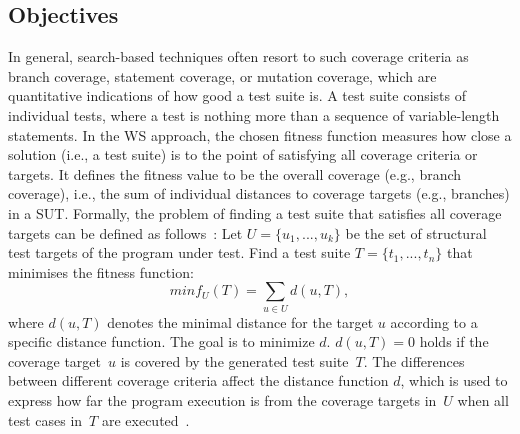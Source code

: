 \documentclass[paper=a4,%
  twoside,%
  BCOR4mm,%
  abstract=true,%
  toc=bibliography,%
  chapterprefix=true,%
  toc=bibliographynumbered,%
  open=right,%
  english,%
  pagesize=pdftex]{scrreprt}
\begin{document}
\subsection{Objectives}
In general, search-based techniques often resort to such coverage criteria as branch coverage, statement coverage, or mutation coverage, which are quantitative indications of how good a test suite is. A test suite consists of individual tests, where a test is nothing more than a sequence of variable-length statements. In the \ac{WS} approach, the chosen fitness function measures how close a solution (i.e., a test suite) is to the point of satisfying all coverage criteria or targets. It defines the fitness value to be the overall coverage (e.g., branch coverage), i.e., the sum of individual distances to coverage targets (e.g., branches) in a \ac{SUT}. Formally, the problem of finding a test suite that satisfies all coverage targets can be defined as follows~\cite{Panichella2018}: Let $U = \{u_1, ..., u_k\}$ be the set of structural test targets of the program under test. Find a test suite $T = \{t_1, ..., t_n\}$ that minimises the fitness function:
\begin{equation}
minf_U(T) = \sum_{u \in U}{d(u, T)},
\end{equation}
where $d(u, T)$ denotes the minimal distance for the target $u$ according to a specific distance function. The goal is to minimize $d$. $d(u, T) = 0$ holds if the coverage target~$u$ is covered by the generated test suite~$T$. The differences between different coverage criteria affect the distance function $d$, which is used to express how far the program execution is from the coverage targets in~$U$ when all test cases in~$T$ are executed~\cite{Panichella2018}.
\end{document}
